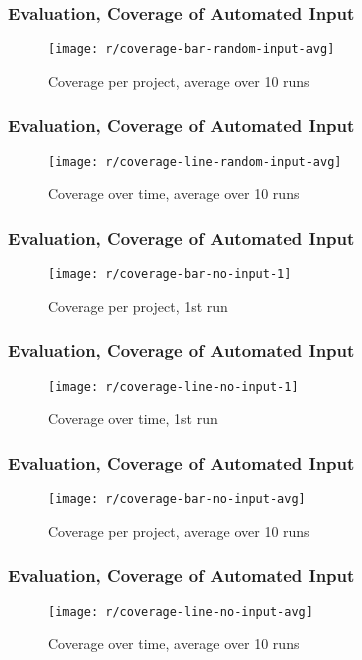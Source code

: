 \begin{frame}\frametitle{Evaluation, Coverage of Automated Input}
    \begin{figure}
        \texttt{[image: r/coverage-bar-random-input-avg]}
        \caption{Coverage per project, average over 10 runs}
    \end{figure}
\end{frame}

\begin{frame}\frametitle{Evaluation, Coverage of Automated Input}
    \begin{figure}
        \texttt{[image: r/coverage-line-random-input-avg]}
        \caption{Coverage over time, average over 10 runs}
    \end{figure}
\end{frame}

\begin{frame}\frametitle{Evaluation, Coverage of Automated Input}
    \begin{figure}
        \texttt{[image: r/coverage-bar-no-input-1]}
        \caption{Coverage per project, 1st run}
    \end{figure}
\end{frame}

\begin{frame}\frametitle{Evaluation, Coverage of Automated Input}
    \begin{figure}
        \texttt{[image: r/coverage-line-no-input-1]}
        \caption{Coverage over time, 1st run}
    \end{figure}
\end{frame}

\begin{frame}\frametitle{Evaluation, Coverage of Automated Input}
    \begin{figure}
        \texttt{[image: r/coverage-bar-no-input-avg]}
        \caption{Coverage per project, average over 10 runs}
    \end{figure}
\end{frame}

\begin{frame}\frametitle{Evaluation, Coverage of Automated Input}
    \begin{figure}
        \texttt{[image: r/coverage-line-no-input-avg]}
        \caption{Coverage over time, average over 10 runs}
    \end{figure}
\end{frame}

